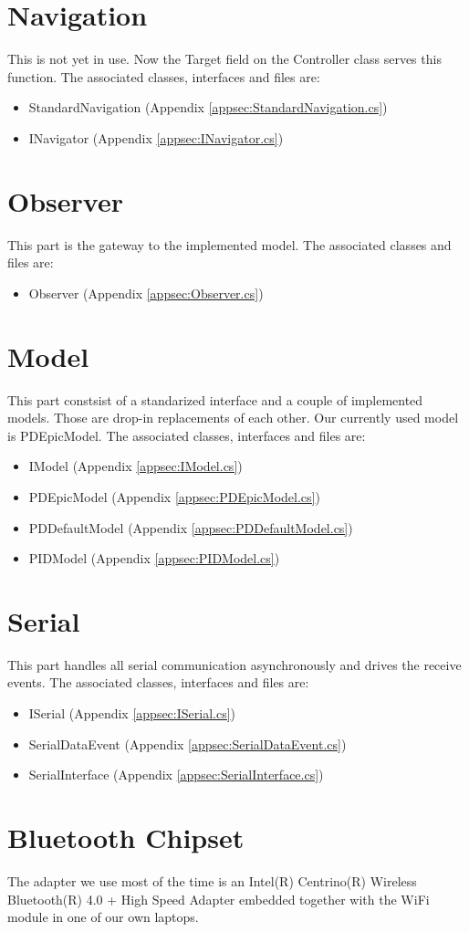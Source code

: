 \documentclass[final]{scrreprt} %
\begin{document}
\section{Navigation}
This is not yet in use. Now the Target field on the Controller class serves this function.
The associated classes, interfaces and files are:
\begin{itemize}
\item StandardNavigation (Appendix \ref{appsec:StandardNavigation.cs})
\item INavigator (Appendix \ref{appsec:INavigator.cs})
\end{itemize}
\section{Observer}
This part is the gateway to the implemented model.
The associated classes and files are:
\begin{itemize}
\item Observer (Appendix \ref{appsec:Observer.cs})
\end{itemize}
\section{Model}
This part constsist of a standarized interface and a couple of implemented models.
Those are drop-in replacements of each other.
Our currently used model is PDEpicModel.
The associated classes, interfaces and files are:
\begin{itemize}
\item IModel (Appendix \ref{appsec:IModel.cs})
\item PDEpicModel (Appendix \ref{appsec:PDEpicModel.cs})
\item PDDefaultModel (Appendix \ref{appsec:PDDefaultModel.cs})
\item PIDModel (Appendix \ref{appsec:PIDModel.cs})
\end{itemize}
\section{Serial}
This part handles all serial communication asynchronously and drives the receive events.
The associated classes, interfaces and files are:
\begin{itemize}
\item ISerial (Appendix \ref{appsec:ISerial.cs})
\item SerialDataEvent (Appendix \ref{appsec:SerialDataEvent.cs})
\item SerialInterface (Appendix \ref{appsec:SerialInterface.cs})
\end{itemize}
\section{Bluetooth Chipset}
The adapter we use most of the time is an Intel(R) Centrino(R) Wireless Bluetooth(R) 4.0 + High Speed Adapter embedded together with the WiFi module in one of our own laptops.
\end{document}
